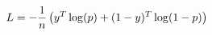 \documentclass[preview]{standalone}
\begin{document}
\begin{align*}
\special{dvisvgm:raw <g id='unique000'>}L=-\frac{1}{n}\left(y^T\log(p)+(1-y)^T\log(1-p)\right)\special{dvisvgm:raw </g>}
\end{align*}
\end{document}
